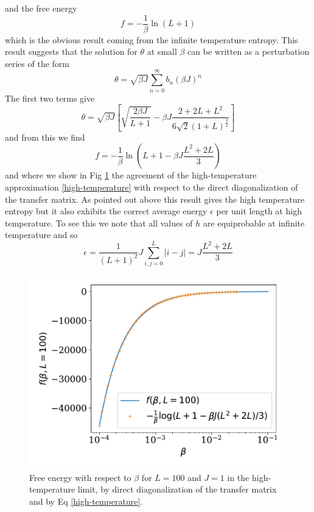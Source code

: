 and the free energy
\begin{equation}
f=-\frac{1}{\beta}\ln(L+1)
\end{equation}
which is the obvious result coming from the infinite temperature entropy. 
This result suggests that the solution for $\theta$ at small $\beta$ can be written as a perturbation series of the form
\begin{equation}
\theta = \sqrt{\beta J}\sum_{n=0}^\infty b_n (\beta J)^n
\end{equation}
The first two terms give
\begin{equation}
\theta = \sqrt{\beta J}\left[\sqrt{\frac{2\beta J}{L+1}} -\beta J \frac{2 + 2L +L^2}{6\sqrt{2}(1+L)^{\frac{3}{2}}}\right]
\end{equation}
and from this we find
\begin{equation}
f=-\frac{1}{\beta}\ln(L+1-\beta J\frac{L^2+2L}{3})
\label{high-temperature} 
\end{equation}
 and where we show in Fig \ref{fig-high-temp} the agreement of the high-temperature approximation \eqref{high-temperature} with respect to the direct diagonalization of the transfer matrix.
As pointed out above this result gives the high temperature entropy but it also exhibits the correct average energy $\epsilon$ per unit length at high temperature. To see this we note that all values of $h$ are equiprobable at infinite temperature and so
\begin{equation}
\epsilon = \frac{1}{(L+1)^2} J \sum_{i,j=0}^L |i-j| = J\frac{L^2+2L}{3}
\end{equation}

\begin{figure}
\centering
\includegraphics[width=0.7\linewidth]{finite-size/high_temperature.pdf}
\caption{Free energy with respect to $\beta$ for $L=100$ and $J=1$ in the high-temperature limit, by direct diagonalization of the transfer matrix and by Eq \eqref{high-temperature}.}
\label{fig-high-temp} 
\end{figure}


